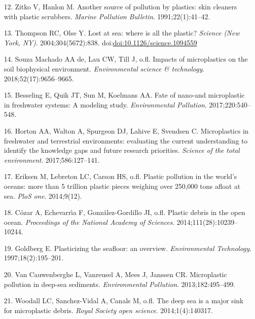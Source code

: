 \documentclass[icelandic,]{book}
\begin{document}
\leavevmode\hypertarget{ref-zitko1991another}{}%
12. Zitko V, Hanlon M. Another source of pollution by plastics: skin cleaners with plastic scrubbers. \emph{Marine Pollution Bulletin}. 1991;22(1):41--42.

\leavevmode\hypertarget{ref-Thompson2004lost}{}%
13. Thompson RC, Olse Y. Lost at sea: where is all the plastic? \emph{Science (New York, NY)}. 2004;304(5672):838. doi:\href{https://doi.org/doi:10.1126/science.1094559}{doi:10.1126/science.1094559}

\leavevmode\hypertarget{ref-de2018impacts}{}%
14. Souza Machado AA de, Lau CW, Till J, o.fl. Impacts of microplastics on the soil biophysical environment. \emph{Environmental science \& technology}. 2018;52(17):9656--9665.

\leavevmode\hypertarget{ref-besseling2017fate}{}%
15. Besseling E, Quik JT, Sun M, Koelmans AA. Fate of nano-and microplastic in freshwater systems: A modeling study. \emph{Environmental Pollution}. 2017;220:540--548.

\leavevmode\hypertarget{ref-horton2017microplastics}{}%
16. Horton AA, Walton A, Spurgeon DJ, Lahive E, Svendsen C. Microplastics in freshwater and terrestrial environments: evaluating the current understanding to identify the knowledge gaps and future research priorities. \emph{Science of the total environment}. 2017;586:127--141.

\leavevmode\hypertarget{ref-eriksen2014plastic}{}%
17. Eriksen M, Lebreton LC, Carson HS, o.fl. Plastic pollution in the world's oceans: more than 5 trillion plastic pieces weighing over 250,000 tons afloat at sea. \emph{PloS one}. 2014;9(12).

\leavevmode\hypertarget{ref-cozar2014plastic}{}%
18. Cózar A, Echevarrı́a F, González-Gordillo JI, o.fl. Plastic debris in the open ocean. \emph{Proceedings of the National Academy of Sciences}. 2014;111(28):10239--10244.

\leavevmode\hypertarget{ref-goldberg1997plasticizing}{}%
19. Goldberg E. Plasticizing the seafloor: an overview. \emph{Environmental Technology}. 1997;18(2):195--201.

\leavevmode\hypertarget{ref-van2013microplastic}{}%
20. Van Cauwenberghe L, Vanreusel A, Mees J, Janssen CR. Microplastic pollution in deep-sea sediments. \emph{Environmental Pollution}. 2013;182:495--499.

\leavevmode\hypertarget{ref-woodall2014deep}{}%
21. Woodall LC, Sanchez-Vidal A, Canals M, o.fl. The deep sea is a major sink for microplastic debris. \emph{Royal Society open science}. 2014;1(4):140317.
\end{document}
